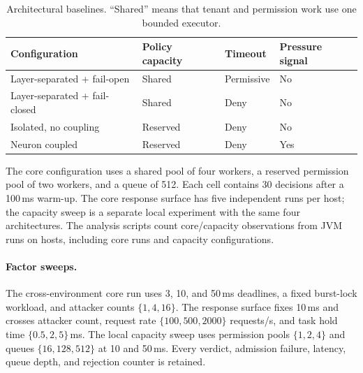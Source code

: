 \begin{table}[t]
\centering
\small
\caption{Architectural baselines. ``Shared'' means that tenant and
permission work use one bounded executor.}
\label{tab:architectures}
\begin{tabular}{llll}
\toprule
Configuration & Policy capacity & Timeout & Pressure signal \\
\midrule
Layer-separated + fail-open   & Shared   & Permissive & No \\
Layer-separated + fail-closed & Shared   & Deny       & No \\
Isolated, no coupling         & Reserved & Deny       & No \\
Neuron coupled                & Reserved & Deny       & Yes \\
\bottomrule
\end{tabular}
\end{table}

The core configuration uses a shared pool of four workers, a reserved
permission pool of two workers, and a queue of 512. Each cell contains 30
decisions after a 100\,ms warm-up. The core response surface has five
independent runs per host; the capacity sweep is a separate local experiment
with the same four architectures. The analysis scripts count
\ComputingObservationCount{} core/capacity observations from
\ComputingRunCount{} JVM runs on \ComputingHostCount{} hosts, including
\ComputingCoreRunCount{} core runs and \ComputingCapacityConfigCount{} capacity
configurations.

\paragraph{Factor sweeps.}
The cross-environment core run uses 3, 10, and 50\,ms deadlines, a fixed
burst-lock workload, and attacker counts $\{1,4,16\}$. The response surface
fixes 10\,ms and crosses attacker count, request rate
$\{100,500,2000\}$ requests/s, and task hold time
$\{0.5,2,5\}$\,ms. The local capacity sweep uses permission pools
$\{1,2,4\}$ and queues $\{16,128,512\}$ at 10 and 50\,ms. Every verdict,
admission failure, latency, queue depth, and rejection counter is retained.

